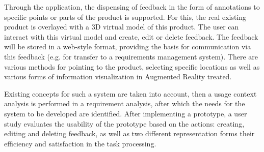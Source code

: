 Through the application, the dispensing of feedback in the form of annotations to specific points or parts of the product is supported. For this, the real existing product is overlayed with a
3D virtual model of this product. The user can interact with this virtual model and create, edit or delete feedback. The feedback will be
stored in a web-style format, providing the basis for communication via this feedback (e.g. for transfer to a requirements management system).
There are various methods for pointing to the product, selecting specific locations as well as various forms of information visualization in Augmented Reality
treated.

Existing concepts for such a system are taken into account, then a usage context analysis is performed in a requirement analysis, after which the needs for the system to be developed are identified.
After implementing a prototype, a user study evaluates the usability of the prototype based on the actions: creating, editing and deleting feedback, as well as two different
representation forms their efficiency and satisfaction in the task processing.
